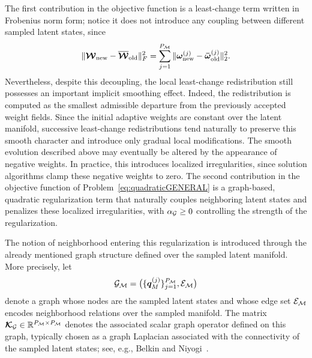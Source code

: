 \documentclass[preprint,10pt]{elsarticle}  %
\newcommand{\PROMPT}[1]{ }
\begin{document}
The first contribution in the objective function is a least-change term written in Frobenius norm
form; notice it does not introduce any coupling between different sampled latent states, since
\[
\|
\boldsymbol{\mathcal{W}}_{\mathrm{new}}-\overline{\boldsymbol{\mathcal{W}}}_{\mathrm{old}}
\|_F^2
=
\sum_{j=1}^{P_{\mathcal{M}}}
\|
\bm{\omega}^{(j)}_{\mathrm{new}}-\bm{\bar{\omega}}^{(j)}_{\mathrm{old}}
\|_2^2.
\]
Nevertheless, despite this decoupling, the local least-change
redistribution still possesses an important implicit smoothing effect.
Indeed, the redistribution is computed as the smallest admissible
departure from the previously accepted weight fields. Since the initial
adaptive weights are constant over the latent manifold, successive
least-change redistributions tend naturally to preserve this smooth
character and introduce only gradual local modifications.
The smooth evolution described above may eventually be altered by the
appearance of negative weights. In practice, this introduces localized irregularities, since solution algorithms    clamp these negative weights  to zero.   The second contribution in the objective function of
Problem~\eqref{eq:quadraticGENERAL} is a graph-based, quadratic
regularization term that naturally couples neighboring latent states and
penalizes these localized irregularities, with \(\alpha_{\mathcal{G}}\ge0\)
controlling the strength of the regularization.

The notion of neighborhood entering this
regularization is introduced through the already mentioned   graph structure
defined over the sampled latent manifold. More precisely,  let
\[
\mathcal{G}_{\mathcal{M}}
=
\big(\{\bm{q}_M^{(j)}\}_{j=1}^{P_{\mathcal{M}}},\mathcal{E}_{\mathcal{M}}\big)
\]
denote a graph whose nodes are the sampled latent states and whose edge
set \(\mathcal{E}_{\mathcal{M}}\) encodes neighborhood relations over the sampled
manifold. The matrix
$
\boldsymbol{\mathcal{K}}_{\mathcal{G}}\in\mathbb{R}^{P_{\mathcal{M}}\times P_{\mathcal{M}}}
$
denotes the associated scalar graph operator defined on this graph,
typically chosen as a graph Laplacian associated with the connectivity
of the sampled latent states; see, e.g.,
Belkin and Niyogi~\cite{belkin2003laplacian}.

\end{document}
